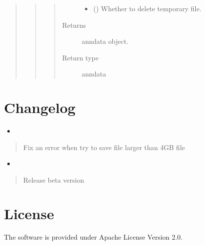 \documentclass[letterpaper,10pt,english]{sphinxmanual}
\begin{document}
\begin{quote}
\begin{quote}
\begin{fulllineitems}
\begin{quote}
\begin{description}
\begin{itemize}
\item {} 
 () \textendash{} Whether to delete temporary file.

\end{itemize}

\item[{Returns}] \leavevmode
anndata object.

\item[{Return type}] \leavevmode
anndata

\end{description}\end{quote}

\end{fulllineitems}

\end{quote}
\end{quote}


\section{Changelog}
\label{\detokenize{changelog/index:changelog}}\label{\detokenize{changelog/index:id1}}\label{\detokenize{changelog/index::doc}}\begin{itemize}
\item {} 

\end{itemize}
\begin{quote}

\sphinxtitleref{-} Fix an error when try to save file larger than 4GB file
\end{quote}
\begin{itemize}
\item {} 

\end{itemize}
\begin{quote}

\sphinxtitleref{-} Release beta version
\end{quote}


\section{License}
\label{\detokenize{license/index:license}}\label{\detokenize{license/index:id1}}\label{\detokenize{license/index::doc}}
The software is provided under Apache License Version 2.0.
\end{document}

